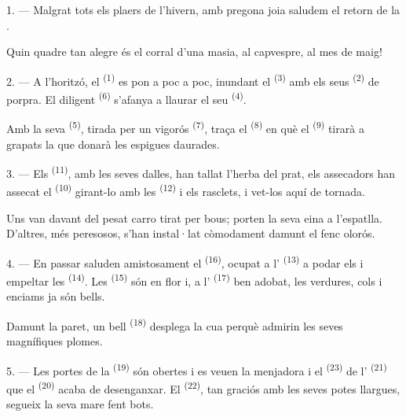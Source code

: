 \VUsaut{3.0mm}
\VUsaut{3.0mm}

\VUsaut{4.0mm}

1. --- Malgrat tots els plaers de l'hivern, amb pregona joia saludem el retorn de la
.

Quin quadre tan alegre és el corral d'una masia, al capvespre, al mes de maig!

2. --- A l'horitzó, el  \textsuperscript{(1)} es pon a poc a poc, inundant el
 \textsuperscript{(3)} amb els seus  \textsuperscript{(2)} de
porpra. El diligent  \textsuperscript{(6)} s'afanya a llaurar el seu
 \textsuperscript{(4)}.

Amb la seva  \textsuperscript{(5)}, tirada per un vigorós
 \textsuperscript{(7)}, traça el 
\textsuperscript{(8)} en què el  \textsuperscript{(9)} tirarà a grapats la
 que donarà les espigues daurades.

3. --- Els  \textsuperscript{(11)}, amb les seves dalles, han tallat l'herba
del prat, els assecadors han assecat el  \textsuperscript{(10)} girant-lo amb les
 \textsuperscript{(12)} i els rasclets, i vet-los aquí de tornada.

Uns van davant del pesat carro tirat per bous; porten la seva eina a l'espatlla. D'altres, més
peresosos, s'han instal·lat còmodament damunt el fenc olorós.

4. --- En passar saluden amistosament el  \textsuperscript{(16)}, ocupat a
l' \textsuperscript{(13)} a podar els
 i empeltar les  \textsuperscript{(14)}.
Les  \textsuperscript{(15)} són en flor i, a l'
\textsuperscript{(17)} ben adobat, les verdures, cols i enciams ja són bells.

Damunt la paret, un bell  \textsuperscript{(18)} desplega la cua perquè admirin
les seves magnífiques plomes.

\VUsaut{3.0mm}

5. --- Les portes de la  \textsuperscript{(19)} són obertes i es veuen la
menjadora i el  \textsuperscript{(23)} de l'
\textsuperscript{(21)} que el  \textsuperscript{(20)} acaba de
desenganxar. El  \textsuperscript{(22)}, tan graciós amb les seves potes
llargues, segueix la seva mare fent bots.

